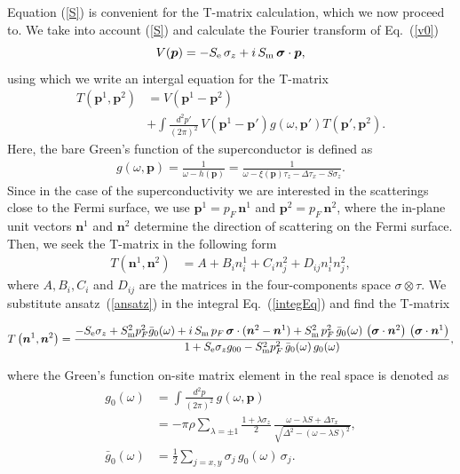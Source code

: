 \documentclass[twocolumn,showpacs,floatfix,nofootinbib,longbibliography]{revtex4-1}
\begin{document}
Equation  (\ref{S}) is convenient for the T-matrix calculation, which we now proceed to. We take into account (\ref{S}) and calculate the Fourier transform of Eq.~(\ref{v0})  
\begin{equation}
	V(\bm p) = -S_{\rm e}\,\sigma_z +  i \,S_{\rm m} \, \bm \sigma\cdot \bm  p,
	\label{vp}
\end{equation}
using which we write an intergal equation for the T-matrix
\begin{align}
	T\left(\bm p^{1},\bm p^{2}\right) &= V \left(\bm p^{1}-\bm p^{2}\right) \nonumber \\
	& +\int \frac{d^2 p'}{\left( 2\pi \right)^2}\, V\left(\bm p^{1}-\bm p'\right) g(\omega,\bm p')  T\left(\bm p',\bm p^{2}\right).
	\label{integEq}
\end{align}
Here, the bare Green's function of the superconductor is defined as 
\begin{align}
	g(\omega,\bm p) = \frac{1}{\omega-h(\bm p)} = \frac{1}{\omega-\xi(\bm p)\tau_z-\Delta \tau_x - S\sigma_z}. \label{g}
\end{align}
Since in the case of the superconductivity we are interested in the scatterings close to the Fermi surface, we use $\bm p^{1} = p_F\, \bm n^{1}$ and $\bm p^{2} = p_F \,\bm n^{2}$, where the in-plane unit vectors $\bm n^{1}$ and $\bm n^{2}$ determine the direction of scattering on the Fermi surface.  Then, we seek the T-matrix in the following form
\begin{align}
	T\left(\bm n^{1},\bm n^{2}\right) &= A + B_i n^{1}_i + C_i n^{2}_j + D_{ij} n^{1}_i n^{2}_j, \label{ansatz}
\end{align}
where  $A,B_i,C_i$ and $D_{ij}$ are the matrices in the four-components space $\sigma\otimes\tau$. We substitute ansatz~(\ref{ansatz}) in the integral Eq.~(\ref{integEq}) and find the T-matrix
\begin{widetext}
\begin{equation}
	T\left(\bm n^{1},\bm n^{2}\right) = \frac{-S_{\rm e}\sigma_z+S^2_{\rm m}p_F^2\bar g_{0}(\omega)+i\,S_{\rm m}\,p_F \,  \bm \sigma\cdot(\bm n^{2}- \bm n^{1}) +S^2_{\rm m}\, p^2_F \, \bar g_{0}(\omega)\,\left(\bm \sigma\cdot\bm n^{2}\right)\,\left(\bm \sigma\cdot \bm n^{1}\right)}{1+S_{\rm e}\sigma_zg_{00}-S^2_{\rm m}p_F^2\,\bar g_{0}(\omega)\, g_{0}(\omega)}, \label{TM}
\end{equation}
\end{widetext}
where the Green's function on-site matrix element in the real space is denoted as 
\begin{align}
	g_{0}(\omega) &   =\int \frac{d^2 p}{\left( 2\pi \right)^2}\, g(\omega,\bm p)  	\label{g0} \\
	 & =-\pi\rho\sum_{\lambda = \pm 1} \frac{1+\lambda\sigma_z}{2}\,\frac{\omega-\lambda S+\Delta\tau_x}{\sqrt{\Delta^2-\left( \omega-\lambda S \right)^2}}, \nonumber \\
	 \bar g_{0}(\omega) & = \frac{1}{2} \sum_{j=x,y}\sigma_j\, g_{0}(\omega)\, \sigma_j.\label{bg0}
\end{align}
\end{document}
